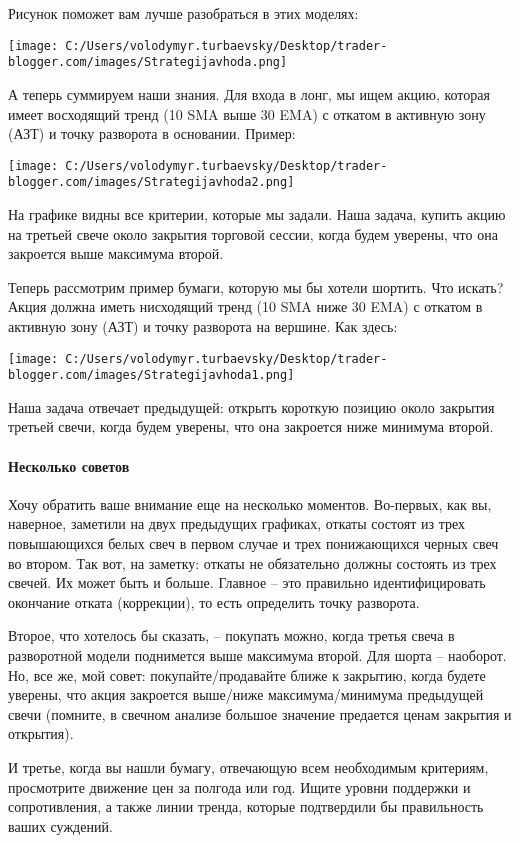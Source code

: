 \documentclass[a5paper]{article}
\begin{document}
Рисунок поможет вам лучше разобраться в этих моделях:

\texttt{[image: C:/Users/volodymyr.turbaevsky/Desktop/trader-blogger.com/images/Strategijavhoda.png]}

А теперь суммируем наши знания. Для входа в лонг, мы ищем акцию,
которая имеет восходящий тренд (10 SMA выше 30 EMA) с откатом в
активную зону (АЗТ) и точку разворота в основании. Пример:

\texttt{[image: C:/Users/volodymyr.turbaevsky/Desktop/trader-blogger.com/images/Strategijavhoda2.png]}

На графике видны все критерии, которые мы задали. Наша задача, купить акцию на третьей свече около закрытия торговой сессии, когда будем уверены, что она закроется выше максимума второй.

Теперь рассмотрим пример бумаги, которую мы бы хотели шортить. Что
искать? Акция должна иметь нисходящий тренд (10 SMA ниже 30 EMA) с
откатом в активную зону (АЗТ) и точку разворота на вершине. Как здесь:

\texttt{[image: C:/Users/volodymyr.turbaevsky/Desktop/trader-blogger.com/images/Strategijavhoda1.png]}

Наша задача отвечает предыдущей: открыть короткую позицию около
закрытия третьей свечи, когда будем уверены, что она закроется ниже
минимума второй.

\paragraph{Несколько советов}

Хочу обратить ваше внимание еще на несколько моментов. Во-первых, как вы, наверное, заметили на двух предыдущих графиках, откаты состоят из трех повышающихся белых свеч в первом случае и трех понижающихся черных свеч во втором. Так вот, на заметку: откаты не обязательно должны состоять из трех свечей. Их может быть и больше. Главное – это правильно идентифицировать окончание отката (коррекции), то есть определить точку разворота.

Второе, что хотелось бы сказать, – покупать можно, когда третья свеча в разворотной модели поднимется выше максимума второй. Для шорта – наоборот. Но, все же, мой совет: покупайте/продавайте ближе к закрытию, когда будете уверены, что акция закроется выше/ниже максимума/минимума предыдущей свечи (помните, в свечном анализе большое значение предается ценам закрытия и открытия).

И третье, когда вы нашли бумагу, отвечающую всем необходимым критериям, просмотрите движение цен за полгода или год. Ищите уровни поддержки и сопротивления, а также линии тренда, которые подтвердили бы правильность ваших суждений.
\end{document}
